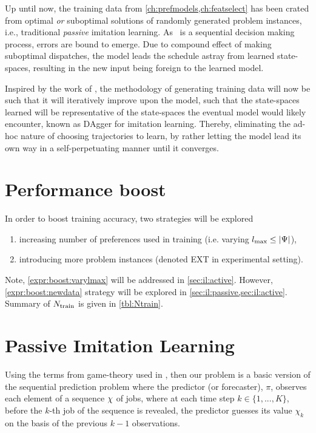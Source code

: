 Up until now, the training data from \cref{ch:prefmodels,ch:featselect} has 
been crated from optimal \emph{or} suboptimal solutions of randomly generated 
problem instances, i.e., traditional \emph{passive} imitation learning. 
As \JSP\ is a sequential decision making process, errors are bound to emerge.  
Due to compound effect of making suboptimal dispatches, the model leads the 
schedule astray from learned state-spaces, resulting in the new input being 
foreign to the learned model. 

Inspired by the work of \cite{RossB10,RossGB11}, the methodology of generating 
training data will now be such that it will iteratively improve upon the model, 
such that the state-spaces learned will be representative of the state-spaces 
the eventual model would likely encounter, known as DAgger for imitation 
learning.
Thereby, eliminating the ad-hoc nature of choosing trajectories to learn, by 
rather letting the model lead its own way in a self-perpetuating manner until 
it converges.

\section*{Performance boost}
In order to boost training accuracy, two strategies will be explored 
\begin{enumerate}[after={{}}, leftmargin=*,
    label={\textbf{Boost.\arabic*}}, ref={{Boost.\arabic*}}]
    \item \label{expr:boost:varylmax} increasing number of preferences used 
    in training (i.e. varying \mbox{$l_{\max} \leq \lvert\Psi\rvert$}),
    \item \label{expr:boost:newdata} introducing more problem instances 
    (denoted EXT in experimental setting).
\end{enumerate}

Note, \ref{expr:boost:varylmax} will be addressed in \cref{sec:il:active}. 
However, \ref{expr:boost:newdata} strategy will be explored in 
\cref{sec:il:passive,sec:il:active}. 
Summary of $N_{\text{train}}$ is given in \cref{tbl:Ntrain}.



\section{Passive Imitation Learning}\label{sec:il:passive}
Using the terms from game-theory used in \citet{CesaBianchi06}, %
then our problem is a basic version of the sequential prediction problem where 
the predictor (or forecaster), $\pi$, observes each element of a sequence 
${\mathbf{\chi}}$ of jobs, where at each time step $k \in \{1,...,K\}$, before the 
$k$-th job of the sequence is revealed, the predictor guesses its value 
$\chi_k$ on the basis of the previous $k-1$ observations. 

